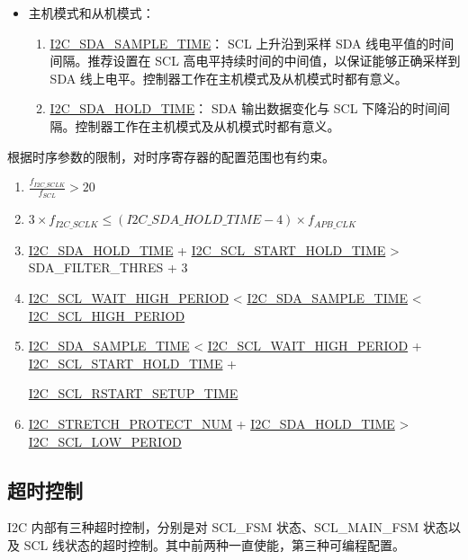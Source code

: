 \documentclass[main\_\_CN.tex]{subfiles}
\begin{document}
\begin{itemize}
\item 主机模式和从机模式：

\begin{enumerate}

\item \hyperref[fielddesc:I2CSDASAMPLETIME]{I2C\_SDA\_SAMPLE\_TIME}：
SCL 上升沿到采样 SDA 线电平值的时间间隔。推荐设置在 SCL 高电平持续时间的中间值，以保证能够正确采样到 SDA 线上电平。控制器工作在主机模式及从机模式时都有意义。

\item \hyperref[fielddesc:I2CSDAHOLDTIME]{I2C\_SDA\_HOLD\_TIME}：
SDA 输出数据变化与 SCL 下降沿的时间间隔。控制器工作在主机模式及从机模式时都有意义。

\end{enumerate}

\end{itemize}

根据时序参数的限制，对时序寄存器的配置范围也有约束。
\begin{enumerate}
\item $\frac{f_{I2C\_SCLK}}{f_{SCL}} > 20$
\item $3 \times f_{I2C\_SCLK} \leq (\hyperref[fielddesc:I2CSDAHOLDTIME]{I2C\_SDA\_HOLD\_TIME}-4) \times f_{APB\_CLK}$
\item \hyperref[fielddesc:I2CSDAHOLDTIME]{I2C\_SDA\_HOLD\_TIME} + \hyperref[fielddesc:I2CSCLSTARTHOLDTIME]{I2C\_SCL\_START\_HOLD\_TIME} > SDA\_FILTER\_THRES + 3
\item \hyperref[fielddesc:I2CSCLWAITHIGHPERIOD]{I2C\_SCL\_WAIT\_HIGH\_PERIOD} < \hyperref[fielddesc:I2CSDASAMPLETIME]{I2C\_SDA\_SAMPLE\_TIME} < \hyperref[fielddesc:I2CSCLHIGHPERIOD]{I2C\_SCL\_HIGH\_PERIOD}
\item \hyperref[fielddesc:I2CSDASAMPLETIME]{I2C\_SDA\_SAMPLE\_TIME} < \hyperref[fielddesc:I2CSCLWAITHIGHPERIOD]{I2C\_SCL\_WAIT\_HIGH\_PERIOD} + \hyperref[fielddesc:I2CSCLSTARTHOLDTIME]{I2C\_SCL\_START\_HOLD\_TIME} +

\hyperref[fielddesc:I2CSCLRSTARTSETUPTIME]{I2C\_SCL\_RSTART\_SETUP\_TIME}
\item \hyperref[fielddesc:I2CSTRETCHPROTECTNUM]{I2C\_STRETCH\_PROTECT\_NUM} + \hyperref[fielddesc:I2CSDAHOLDTIME]{I2C\_SDA\_HOLD\_TIME} > \hyperref[fielddesc:I2CSCLLOWPERIOD]{I2C\_SCL\_LOW\_PERIOD}
\end{enumerate}

\subsection{超时控制}
I2C 内部有三种超时控制，分别是对 SCL\_FSM 状态、SCL\_MAIN\_FSM 状态以及 SCL 线状态的超时控制。其中前两种一直使能，第三种可编程配置。
\end{document}
